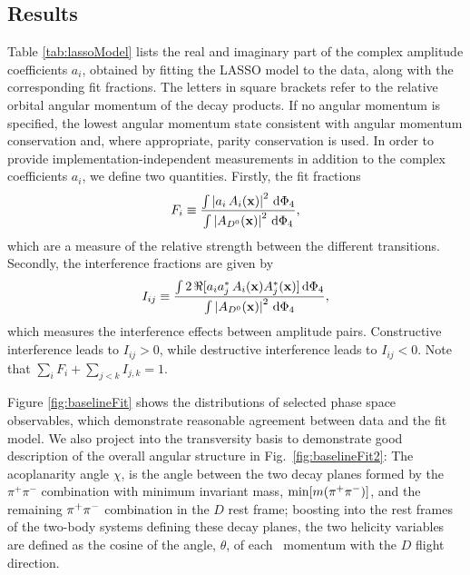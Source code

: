 \clearpage
\subsection{Results}

Table \ref{tab:lassoModel} 
lists the real and imaginary part of the complex amplitude coefficients $a_{i}$, 
obtained by fitting the LASSO model to the data,
along with the corresponding fit fractions. 
The letters in square brackets refer to the relative orbital angular momentum of the decay products. 
If no angular momentum is specified, the lowest angular momentum state consistent with angular momentum conservation and, where appropriate, parity conservation is used.
In order to provide implementation-independent measurements in addition to the complex coefficients $a_i$, we define two quantities. Firstly, the fit fractions
\begin{equation}
\label{eq:DefineFitFractions}
	F_{i} \equiv \frac{\int \left\vert   a_{i} \, A_{i}(\mathbf{x}) \right\vert^{2} \, \text{d}\Phi_{4} }
	{\int \left\vert  A_{{{D}^0}}(\mathbf{x}) \right\vert^{2} \, \text{d}\Phi_{4}}, 
\end{equation}
which are a measure of the relative strength between the different transitions. Secondly, the interference fractions are given by
\begin{equation}
\label{eq:DefineInterferenceFractions}
	I_{ij} \equiv \frac{\int  2\,\Re[a_{i}a^*_{j} \, A_{i}(\mathbf{x}) A^*_{j}(\mathbf{x}) ] \, \text{d}\Phi_{4} }
	{\int \left\vert  A_{{{D}^0}}(\mathbf{x}) \right\vert^{2} \, \text{d}\Phi_{4}} ,
\end{equation}
which measures the interference effects between amplitude pairs. Constructive interference leads to $I_{ij} > 0$, while destructive interference leads to $I_{ij} < 0$. Note that $\sum_i F_{i} + \sum_{j<k} I_{j,k} = 1$.

Figure \ref{fig:baselineFit} shows the distributions of 
selected phase space observables, which demonstrate 
reasonable agreement between data and the fit model. 
We also project into the transversity basis to demonstrate good description of the overall angular structure in
Fig.~\ref{fig:baselineFit2}: 
The acoplanarity angle 
${\chi}$, is the angle between the two decay planes formed by 
the $\pi^+\pi^-$ combination with minimum invariant mass, ${\rm min}[m(\pi^+\pi^-)]$,  
and the remaining ${{\pi}^+} {{\pi}^-}$ combination
in the $D$ rest frame; boosting into the rest frames of the two-body systems defining these decay planes,
the two helicity variables 
are defined as the cosine of the angle, ${\theta}$, 
of each \pip\ momentum with the $D$ flight direction.

